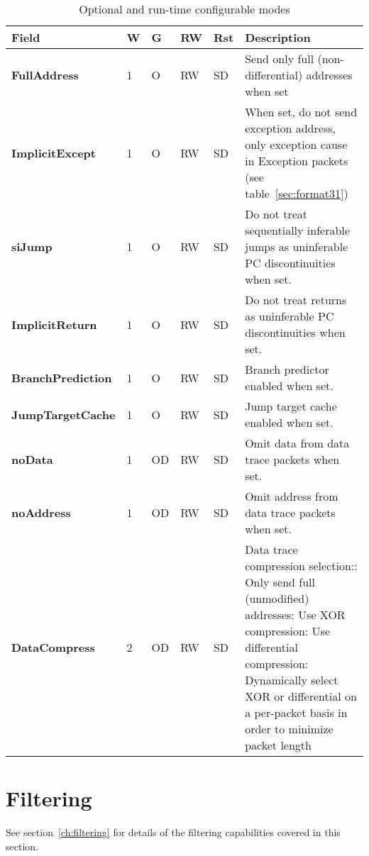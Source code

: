 \begin{table}[htp]
  \centering
  \caption{Optional and run-time configurable modes}
  \label{tab:ctl-resync}
  \begin{tabulary}{\textwidth}{|l|l|l|l|l|p{80mm}|}
    \hline
    {\bf Field} & {\bf W} & {\bf G} & {\bf RW} & {\bf Rst} & {\bf Description} \\
    \hline
    \textbf{FullAddress} & 1 & O & RW & SD & Send only full (non-differential) addresses when set\\
    \hline
    \textbf{ImplicitExcept} & 1 & O & RW & SD & When set, do not send exception address, only exception cause in 
      Exception packets (see table~\ref{sec:format31})\\
    \hline
    \textbf{siJump} & 1 & O & RW & SD & Do not treat sequentially inferable jumps as uninferable PC discontinuities when set.\\
    \hline
    \textbf{ImplicitReturn} & 1 & O & RW & SD & Do not treat returns as uninferable PC discontinuities when set.\\
    \hline
    \textbf{BranchPrediction} & 1 & O & RW & SD & Branch predictor enabled when set.\\
    \hline
    \textbf{JumpTargetCache} & 1 & O & RW & SD & Jump target cache enabled when set.\\
    \hline
    \textbf{noData} & 1 & OD & RW & SD & Omit data from data trace packets when set.\\
    \hline
    \textbf{noAddress} & 1 & OD & RW & SD & Omit address from data trace packets when set.\\
    \hline
    \textbf{DataCompress} & 2 & OD & RW & SD & Data trace compression selection:: Only send full (unmodified) addresses: Use XOR compression: Use differential compression: Dynamically select XOR or differential on a per-packet basis in order to minimize packet length\\
    \hline
  \end{tabulary}
\end{table}


\section{Filtering} \label{sec:ctl-filter}

See section~\ref{ch:filtering} for details of the filtering capabilities covered in this section.

